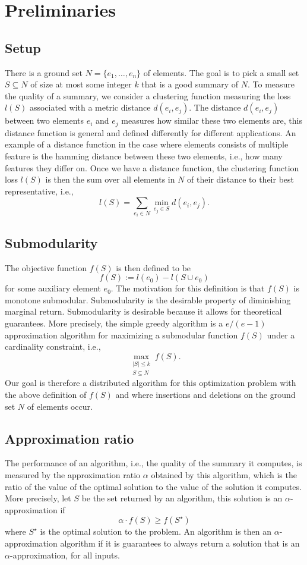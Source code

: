 \section{Preliminaries}
\label{s:prelim}
\subsection{Setup} There is a ground set $N = \{e_1, \ldots, e_n\}$ of elements. The goal is to pick a small set $S \subseteq N$ of size at most some integer $k$ that is a good summary of $N$. To measure the quality of a summary, we consider a clustering function measuring the loss $l(S)$ associated with a metric distance $d(e_i, e_j)$. The distance $d(e_i, e_j)$ between two elements $e_i$ and $e_j$ measures how similar these two elements are, this distance function is general and defined differently for different applications. An example of a distance function in the case where elements consists of multiple feature is the hamming distance between these two elements, i.e., how many features they differ on. Once we have a distance function, the clustering function loss $l(S)$ is then the sum over all elements in  $N$ of their distance to their best representative, i.e.,
%
$$l(S) = \sum_{e_i \in N} \min_{e_j \in S} d(e_i, e_j).$$
%



\subsection{Submodularity}
The objective function $f(S)$ is then defined to be 
%
$$f(S) := l(e_0) - l(S \cup e_0)$$
%
 for some auxiliary element $e_0$. The motivation for this definition is that $f(S)$ is monotone submodular. Submodularity is the desirable property of diminishing marginal return. Submodularity is desirable because it allows for theoretical guarantees. More precisely, the simple greedy algorithm is a $e/(e-1)$ approximation algorithm for maximizing a submodular function $f(S)$ under a cardinality constraint, i.e., 
 $$
 \max_{\substack{|S| \leq k \\ S \subseteq N}}f(S).
 $$
 Our goal is therefore a distributed algorithm for this optimization problem with the above definition of $f(S)$ and where insertions and deletions on the ground set $N$ of elements occur.

\subsection{Approximation ratio} The performance of an algorithm, i.e., the quality of the summary it computes, is measured by the approximation ratio $\alpha$ obtained by this algorithm, which is the ratio of the value of the optimal solution to the value of the solution it computes. More precisely, let $S$ be the set returned by an algorithm, this solution is an $\alpha$-approximation if 
%
$$\alpha \cdot  f(S) \geq f(S^\star)$$
%
where $S^{\star}$ is the optimal solution to the problem. An algorithm is then an $\alpha$-approximation algorithm if it is guarantees to always return a solution that is an $\alpha$-approximation, for all inputs.

